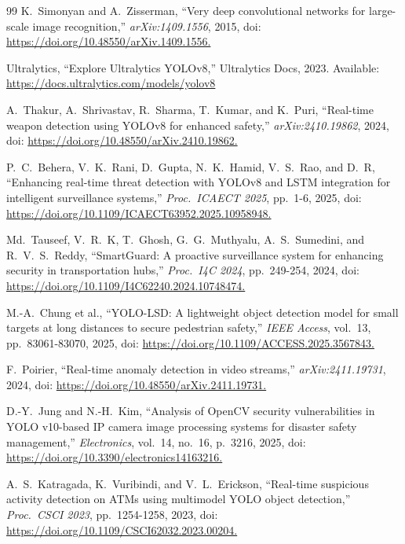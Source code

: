 \begin{thebibliography}{99}
K.~Simonyan and A.~Zisserman, ``Very deep convolutional networks for large-scale image recognition,''
\textit{arXiv:1409.1556}, 2015,
doi: \url{https://doi.org/10.48550/arXiv.1409.1556.}

Ultralytics, ``Explore Ultralytics YOLOv8,''
Ultralytics Docs, 2023.
Available: \url{https://docs.ultralytics.com/models/yolov8}

A.~Thakur, A.~Shrivastav, R.~Sharma, T.~Kumar, and K.~Puri, ``Real-time weapon detection using YOLOv8 for enhanced safety,''
\textit{arXiv:2410.19862}, 2024,
doi: \url{https://doi.org/10.48550/arXiv.2410.19862.}

P.~C.~Behera, V.~K.~Rani, D.~Gupta, N.~K.~Hamid, V.~S.~Rao, and D.~R, ``Enhancing real-time threat detection with YOLOv8 and LSTM integration for intelligent surveillance systems,''
\textit{Proc.\ ICAECT 2025}, pp.~1-6, 2025,
doi: \url{https://doi.org/10.1109/ICAECT63952.2025.10958948.}

Md.~Tauseef, V.~R.~K, T.~Ghosh, G.~G.~Muthyalu, A.~S.~Sumedini, and R.~V.~S.~Reddy, ``SmartGuard: A proactive surveillance system for enhancing security in transportation hubs,''
\textit{Proc.\ I4C 2024}, pp.~249-254, 2024,
doi: \url{https://doi.org/10.1109/I4C62240.2024.10748474.}

M.-A.~Chung et al., ``YOLO-LSD: A lightweight object detection model for small targets at long distances to secure pedestrian safety,''
\textit{IEEE Access}, vol.~13, pp.~83061-83070, 2025,
doi: \url{https://doi.org/10.1109/ACCESS.2025.3567843.}

F.~Poirier, ``Real-time anomaly detection in video streams,''
\textit{arXiv:2411.19731}, 2024,
doi: \url{https://doi.org/10.48550/arXiv.2411.19731.}

D.-Y.~Jung and N.-H.~Kim, ``Analysis of OpenCV security vulnerabilities in YOLO v10-based IP camera image processing systems for disaster safety management,''
\textit{Electronics}, vol.~14, no.~16, p.~3216, 2025,
doi: \url{https://doi.org/10.3390/electronics14163216.}

A.~S.~Katragada, K.~Vuribindi, and V.~L.~Erickson, ``Real-time suspicious activity detection on ATMs using multimodel YOLO object detection,''
\textit{Proc.\ CSCI 2023}, pp.~1254-1258, 2023,
doi: \url{https://doi.org/10.1109/CSCI62032.2023.00204.}


\end{thebibliography}
